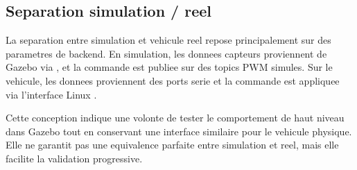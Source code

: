 \subsection{Separation simulation / reel}

La separation entre simulation et vehicule reel repose principalement sur des parametres de backend. En simulation, les donnees capteurs proviennent de Gazebo via , et la commande est publiee sur des topics PWM simules. Sur le vehicule, les donnees proviennent des ports serie et la commande est appliquee via l'interface Linux .

Cette conception indique une volonte de tester le comportement de haut niveau dans Gazebo tout en conservant une interface similaire pour le vehicule physique. Elle ne garantit pas une equivalence parfaite entre simulation et reel, mais elle facilite la validation progressive.

